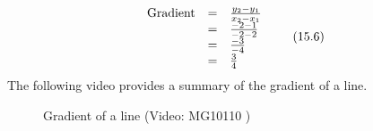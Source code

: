     \begin{equation}
    \begin{array}{ccc}\hfill \mathrm{Gradient}& =& \frac{{y}_{2}-{y}_{1}}{{x}_{2}-{x}_{1}}\hfill \\ & =& \frac{-2-1}{-2-2}\hfill \\ & =& \frac{-3}{-4}\hfill \\ & =& \frac{3}{4}\hfill \end{array}\tag{15.6}
      \end{equation}
        \label{m39108*eip-611}The following video provides a summary of the gradient of a line.
    \setcounter{subfigure}{0}
	\begin{figure}[H] %
    \textnormal{Gradient of a line}\vspace{.1in} \nopagebreak
  \label{m39108*yt-media1}\label{m39108*yt-video1}
             { (Video:  MG10110 )}
      \vspace{2pt}
    \vspace{.1in}
 \end{figure}       \par 
      \label{m39108**end}
%     
%     
%     
      \label{m39119*uid43}
